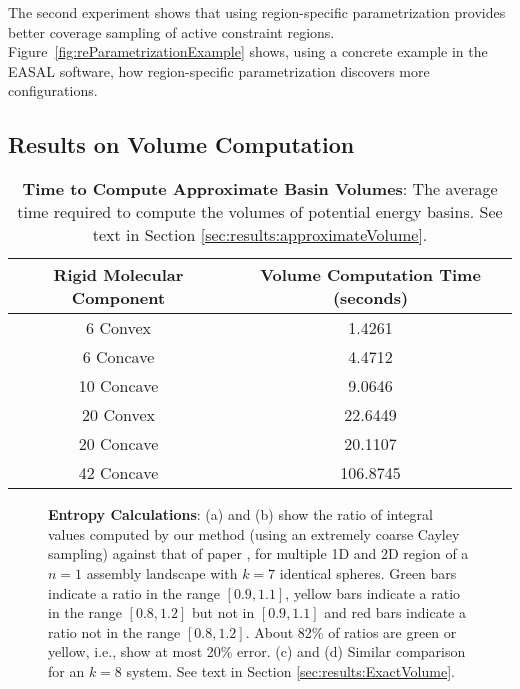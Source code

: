 \documentclass[]{article}
\newcommand{\figref}[1]{Figure~\ref{#1}}
\begin{document}
The second experiment shows that using region-specific parametrization provides
better coverage sampling of active constraint regions.
\figref{fig:reParametrizationExample} shows, using a concrete example in the
EASAL software, how region-specific parametrization discovers more
configurations.

\subsection{Results on Volume Computation}
\label{sec:results:Volumes}
\begin{table}[htpb]
\centering
\begin{tabular}{cc}\hline
Rigid Molecular Component&Volume Computation Time (seconds)\\\hline
6 Convex&	1.4261\\\hline
6 Concave& 4.4712\\\hline
10 Concave& 9.0646\\\hline
20 Convex& 22.6449\\\hline
20 Concave& 20.1107\\\hline
42 Concave& 106.8745\\ \hline
\end{tabular}
\caption{\scriptsize \textbf{Time to Compute Approximate Basin Volumes}: 
The average time required to compute the volumes of potential energy basins. 
See text in Section \ref{sec:results:approximateVolume}.
}
\label{table:BasinVolume}
\end{table}
\begin{figure*}[htpb]
   \centering
{}
\caption{\scriptsize \textbf{Entropy Calculations}: (a) and (b) show the ratio of integral values computed by our 
method (using an extremely coarse Cayley sampling) against that of paper \cite{Holmes-Cerfon2013}, for 
multiple 1D and 2D region of a $n=1$ assembly landscape with $k=7$ identical spheres.
Green bars indicate a ratio in the range $[0.9, 1.1]$, yellow bars
indicate a ratio in the range $[0.8,1.2]$ but not in $[0.9, 1.1]$ and red bars indicate a ratio not in the range $[0.8, 1.2]$.
About 82\% of ratios are green or yellow, i.e., show at most 20\% error.
(c) and (d) Similar comparison for an $k=8$ system.
See text in Section \ref {sec:results:ExactVolume}.}
\label{fig:result_v7}
\end{figure*}
\end{document}
